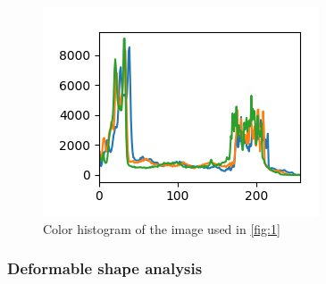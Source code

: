 \documentclass[conference]{IEEEtran}
\begin{document}
				\begin{figure}[!ht]
					\centerline{\includegraphics[width=\linewidth]{imgs/obama_histogram.png}}
					\caption{Color histogram of the image used in \ref{fig:1}}
					\label{fig:2}
				\end{figure}
				
				\subsubsection{Deformable shape analysis}
			
\end{document}
